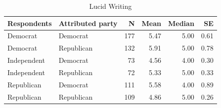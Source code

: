 \begin{table}[ht]
\centering
\caption{Lucid Writing}
\label{tab:error_sum_lucid}
\begin{tabular}{llrrrr}
  \toprule
Respondents & Attributed party & N & Mean & Median & SE \\
  \midrule
Democrat & Democrat & 177 & 5.47 & 5.00 & 0.61 \\
  Democrat & Republican & 132 & 5.91 & 5.00 & 0.78 \\
  Independent & Democrat &  73 & 4.56 & 4.00 & 0.30 \\
  Independent & Republican &  72 & 5.33 & 5.00 & 0.33 \\
  Republican & Democrat & 111 & 5.58 & 4.00 & 0.89 \\
  Republican & Republican & 109 & 4.86 & 5.00 & 0.26 \\
   \bottomrule
\end{tabular}
\end{table}
